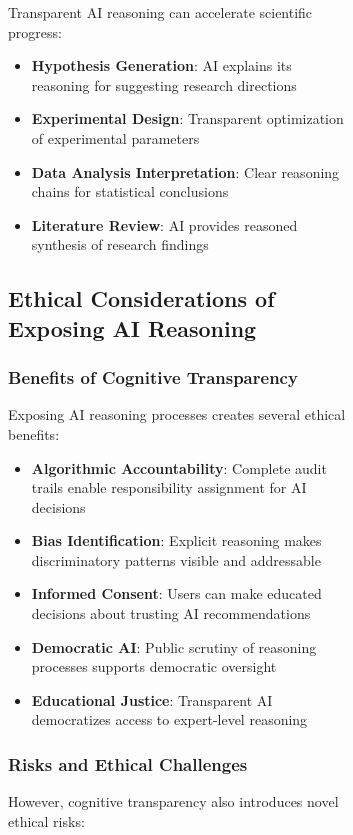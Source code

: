 \begin{figure}[H]
\begin{table}[H]
\begin{figure}[H]
\begin{table}[H]
Transparent AI reasoning can accelerate scientific progress:

\begin{itemize}
    \item \textbf{Hypothesis Generation}: AI explains its reasoning for suggesting research directions
    \item \textbf{Experimental Design}: Transparent optimization of experimental parameters
    \item \textbf{Data Analysis Interpretation}: Clear reasoning chains for statistical conclusions
    \item \textbf{Literature Review}: AI provides reasoned synthesis of research findings
\end{itemize}

\subsection{Ethical Considerations of Exposing AI Reasoning}

\subsubsection{Benefits of Cognitive Transparency}

Exposing AI reasoning processes creates several ethical benefits:

\begin{itemize}
    \item \textbf{Algorithmic Accountability}: Complete audit trails enable responsibility assignment for AI decisions
    \item \textbf{Bias Identification}: Explicit reasoning makes discriminatory patterns visible and addressable
    \item \textbf{Informed Consent}: Users can make educated decisions about trusting AI recommendations
    \item \textbf{Democratic AI}: Public scrutiny of reasoning processes supports democratic oversight
    \item \textbf{Educational Justice}: Transparent AI democratizes access to expert-level reasoning
\end{itemize}

\subsubsection{Risks and Ethical Challenges}

However, cognitive transparency also introduces novel ethical risks:


\end{table}
\end{figure}
\end{table}
\end{figure}

